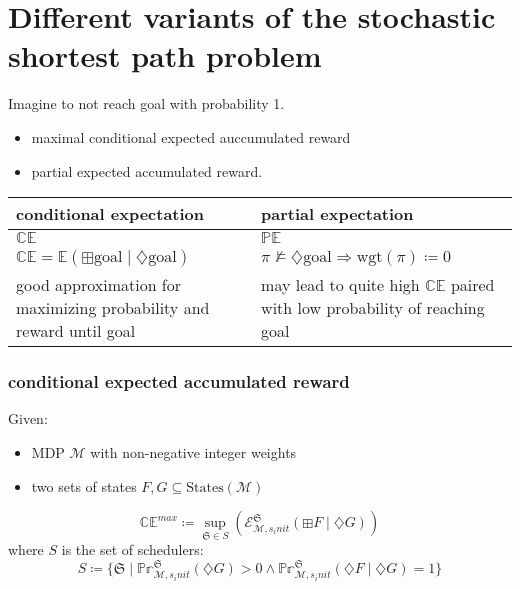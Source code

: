 \documentclass[onlymath]{beamer}
\begin{document}
\section{Different variants of the stochastic shortest path problem}

\begin{frame}
	Imagine to not reach goal with probability 1.
	\begin{itemize}
		\item maximal conditional expected auccumulated reward
		\item partial expected accumulated reward.
	\end{itemize}
\end{frame}

\begin{frame}
	\begin{tabular}{|p{5cm}|p{5cm}|}
		\hline
		conditional expectation & partial expectation \\ \hline
		$\mathbb{CE}$ & $\mathbb{PE}$ \\ \hline
		$\mathbb{CE} = \mathbb{E}(\boxplus \mathrm{goal}\mid \diamondsuit \mathrm{goal})$ & $\pi \nvDash \diamondsuit\mathrm{goal} \Rightarrow \mathrm{wgt}(\pi)\coloneqq0$ \\ \hline
		good approximation for \newline maximizing probability and reward until goal & may lead to quite high $\mathbb{CE}$ paired with \newline low probability of reaching goal \\ \hline
		
	\end{tabular}
\end{frame}

\begin{frame}
	\frametitle{conditional expected accumulated reward}
	Given:
	\begin{itemize}
		\item MDP $\mathcal{M}$ with non-negative integer weights
		\item two sets of states $F, G \subseteq \mathrm{States}(\mathcal{M})$
	\end{itemize}
	\begin{definition}
		\[
		\mathbb{CE}^{max} \coloneqq \sup_{\mathfrak{S} \in S}(\mathcal{E}_{\mathcal{M}, s_init}^{\mathfrak{S}}(\boxplus F \mid \diamondsuit G))
		\]
		where $S$ is the set of schedulers: %
		\[
		S \coloneqq \{\mathfrak{S} \mid \mathbb{Pr}_{\mathcal{M},s_init}^{\mathfrak{S}}(\diamondsuit G) > 0 \land \mathbb{Pr}_{\mathcal{M},s_init}^{\mathfrak{S}}(\diamondsuit F \mid \diamondsuit G) = 1\}
		\]
		
	\end{definition}
	
\end{frame}
\end{document}
